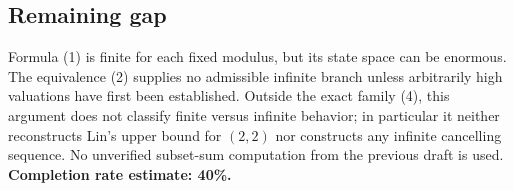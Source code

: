 \subsection*{Remaining gap}
Formula (1) is finite for each fixed modulus, but its state space can be enormous. The equivalence (2) supplies no admissible infinite branch unless arbitrarily high valuations have first been established. Outside the exact family (4), this argument does not classify finite versus infinite behavior; in particular it neither reconstructs Lin's upper bound for $(2,2)$ nor constructs any infinite cancelling sequence. No unverified subset-sum computation from the previous draft is used.
\textbf{Completion rate estimate: 40\%.}
